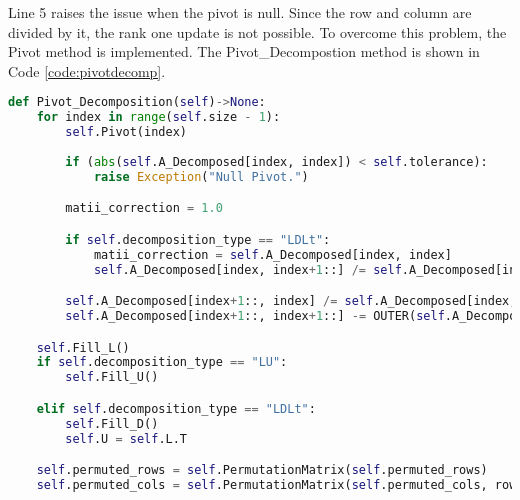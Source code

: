 Line 5 raises the issue when the pivot is null. Since the row and column are divided by it, the rank one update is not possible. To overcome this problem, the Pivot method is implemented. The Pivot\_Decompostion method is shown in Code \ref{code:pivotdecomp}.
\begin{lstlisting}[language=Python, caption={Pivot method.}, label={code:pivotdecomp}]
def Pivot_Decomposition(self)->None:
    for index in range(self.size - 1):
        self.Pivot(index)
        
        if (abs(self.A_Decomposed[index, index]) < self.tolerance):
            raise Exception("Null Pivot.")

        matii_correction = 1.0

        if self.decomposition_type == "LDLt":
            matii_correction = self.A_Decomposed[index, index]
            self.A_Decomposed[index, index+1::] /= self.A_Decomposed[index, index]

        self.A_Decomposed[index+1::, index] /= self.A_Decomposed[index, index]
        self.A_Decomposed[index+1::, index+1::] -= OUTER(self.A_Decomposed[index+1::, index], self.A_Decomposed[index, index+1::]) * matii_correction

    self.Fill_L()
    if self.decomposition_type == "LU":
        self.Fill_U()

    elif self.decomposition_type == "LDLt":
        self.Fill_D()
        self.U = self.L.T

    self.permuted_rows = self.PermutationMatrix(self.permuted_rows)
    self.permuted_cols = self.PermutationMatrix(self.permuted_cols, rows=False)
\end{lstlisting}

